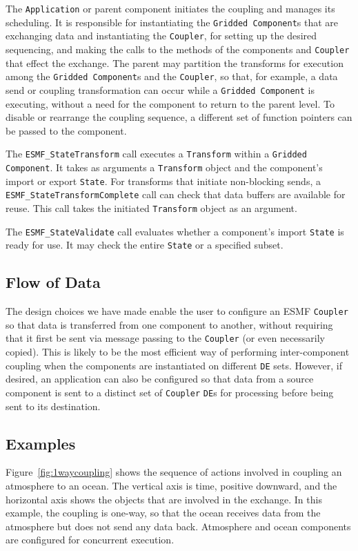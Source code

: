 The {\tt Application} or parent component initiates the coupling and manages 
its scheduling.  It is responsible for instantiating the {\tt Gridded Component}s
that are exchanging data and instantiating the {\tt Coupler}, for setting up the desired 
sequencing, and making the calls to the methods of the components and 
{\tt Coupler} that effect the exchange.  The parent may partition the 
transforms
for execution among the {\tt Gridded Component}s and the {\tt Coupler}, so that, for 
example, a data send or coupling transformation can occur while a {\tt Gridded 
Component} is executing, without a need for the component to return to the
parent level.  
To disable or rearrange the coupling sequence, a different set of function
pointers can be passed to the component.

The {\tt ESMF\_StateTransform} call executes a {\tt Transform} 
within a {\tt Gridded Component}.  It takes as arguments a
{\tt Transform} object and the component's import or export {\tt State}.  
For transforms that initiate non-blocking sends, a {\tt ESMF\_StateTransformComplete} 
call can check that data  buffers are available for reuse.  This 
call takes the initiated {\tt Transform} object as an argument.

The {\tt ESMF\_StateValidate} call evaluates whether a component's 
import {\tt State} is ready for use.  It may check the entire {\tt State} or 
a specified subset.

\subsection{Flow of Data}
\label{sec:dataflow}
The design choices we have made enable the user to configure an ESMF
{\tt Coupler} so that data is transferred from one component to another, 
without requiring that it first be sent via message passing to the
{\tt Coupler} (or even necessarily
copied).  This is likely to be the most efficient way of performing 
inter-component coupling when the components are instantiated on different
{\tt DE} sets.  However, if desired, an application can also be configured so that
data from a source component is sent to a distinct set of {\tt Coupler} 
{\tt DE}s for processing before being sent to its destination.

\subsection{Examples}

Figure~\ref{fig:1waycoupling} shows the sequence of actions involved
in coupling an atmosphere to an ocean.  The vertical axis is time, positive
downward, and the horizontal axis shows the objects that are involved in the
exchange.  In this example, the coupling is one-way, so that the ocean 
receives data from the atmosphere but does not send any data back.  Atmosphere
and ocean components are configured for concurrent execution.

